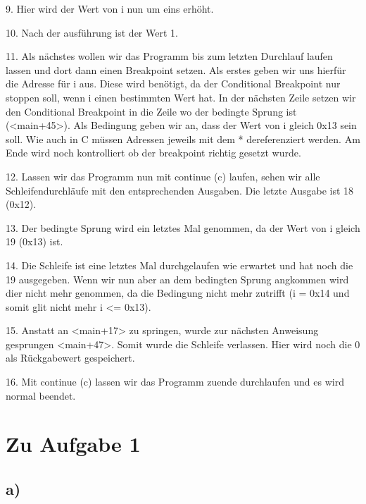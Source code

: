 \documentclass[12pt]{article}
\begin{document}
{9. Hier wird der Wert von i nun um eins erhöht.


10. Nach der ausführung ist der Wert 1.


11. Als nächstes wollen wir das Programm bis zum letzten Durchlauf laufen lassen und dort dann einen Breakpoint setzen. Als erstes geben wir uns hierfür die Adresse für i aus. Diese wird benötigt, da der Conditional Breakpoint nur stoppen soll, wenn i einen bestimmten Wert hat. In der nächsten Zeile setzen wir den Conditional Breakpoint in die Zeile wo der bedingte Sprung ist (<main+45>). Als Bedingung geben wir an, dass der Wert von i gleich 0x13 sein soll. Wie auch in C müssen Adressen jeweils mit dem * dereferenziert werden. Am Ende wird noch kontrolliert ob der breakpoint richtig gesetzt wurde.


12. Lassen wir das Programm nun mit continue (c) laufen, sehen wir alle Schleifendurchläufe mit den entsprechenden Ausgaben. Die letzte Ausgabe ist 18 (0x12).


13. Der bedingte Sprung wird ein letztes Mal genommen, da der Wert von i gleich 19 (0x13) ist.


14. Die Schleife ist eine letztes Mal durchgelaufen wie erwartet und hat noch die 19 ausgegeben. Wenn wir nun aber an dem bedingten Sprung angkommen wird dier nicht mehr genommen, da die Bedingung nicht mehr zutrifft (i = 0x14 und somit glit nicht mehr i <= 0x13).


15. Anstatt an <main+17> zu springen, wurde zur nächsten Anweisung gesprungen <main+47>. Somit wurde die Schleife verlassen. Hier wird noch die 0 als Rückgabewert gespeichert. 


16. Mit continue (c) lassen wir das Programm zuende durchlaufen und es wird normal beendet.


\section{Zu Aufgabe 1}
\subsection{a)}

}
\end{document}
